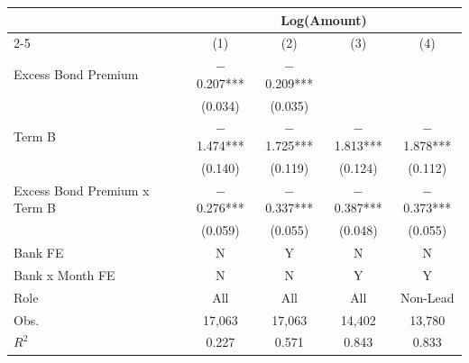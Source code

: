 {
\def\sym#1{\ifmmode^{#1}\else\(^{#1}\)\fi}
\begin{tabular}{l*{4}{c}}
\toprule\toprule
                                        &\multicolumn{4}{c}{Log(Amount)}                                \\\cmidrule(lr){2-5}
                                        &\multicolumn{1}{c}{(1)}   &\multicolumn{1}{c}{(2)}   &\multicolumn{1}{c}{(3)}   &\multicolumn{1}{c}{(4)}   \\
\toprule
Excess Bond Premium                     &    $-$0.207***&    $-$0.209***&               &               \\
                                        &     (0.034)   &     (0.035)   &               &               \\
[1em]
Term B                                  &    $-$1.474***&    $-$1.725***&    $-$1.813***&    $-$1.878***\\
                                        &     (0.140)   &     (0.119)   &     (0.124)   &     (0.112)   \\
[1em]
Excess Bond Premium x Term B            &    $-$0.276***&    $-$0.337***&    $-$0.387***&    $-$0.373***\\
                                        &     (0.059)   &     (0.055)   &     (0.048)   &     (0.055)   \\
\toprule
Bank FE                                 &           N   &           Y   &           N   &           N   \\
Bank x Month FE                         &           N   &           N   &           Y   &           Y   \\
Role                                    &         All   &         All   &         All   &    Non-Lead   \\
Obs.                                    &      17,063   &      17,063   &      14,402   &      13,780   \\
$R^2$                                   &       0.227   &       0.571   &       0.843   &       0.833   \\
\toprule\toprule
\end{tabular}
}
